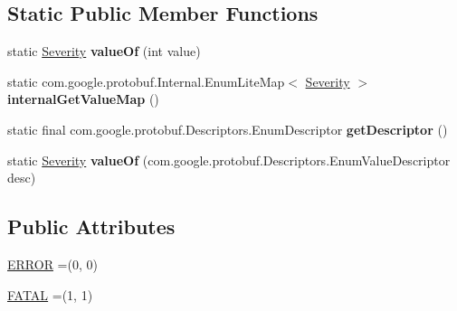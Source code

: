 \subsection*{Static Public Member Functions}
\begin{DoxyCompactItemize}
\item 
\mbox{\label{enumcom_1_1mysql_1_1cj_1_1x_1_1protobuf_1_1_mysqlx_1_1_error_1_1_severity_a1daeaa1ff1049d808780fcfdfad53342}} 
static \mbox{\hyperlink{enumcom_1_1mysql_1_1cj_1_1x_1_1protobuf_1_1_mysqlx_1_1_error_1_1_severity}{Severity}} {\bfseries value\+Of} (int value)
\item 
\mbox{\label{enumcom_1_1mysql_1_1cj_1_1x_1_1protobuf_1_1_mysqlx_1_1_error_1_1_severity_ac0fee37ff34068f9f9136e35feaab632}} 
static com.\+google.\+protobuf.\+Internal.\+Enum\+Lite\+Map$<$ \mbox{\hyperlink{enumcom_1_1mysql_1_1cj_1_1x_1_1protobuf_1_1_mysqlx_1_1_error_1_1_severity}{Severity}} $>$ {\bfseries internal\+Get\+Value\+Map} ()
\item 
\mbox{\label{enumcom_1_1mysql_1_1cj_1_1x_1_1protobuf_1_1_mysqlx_1_1_error_1_1_severity_adbaebbd562c962c4799803037fbb488b}} 
static final com.\+google.\+protobuf.\+Descriptors.\+Enum\+Descriptor {\bfseries get\+Descriptor} ()
\item 
\mbox{\label{enumcom_1_1mysql_1_1cj_1_1x_1_1protobuf_1_1_mysqlx_1_1_error_1_1_severity_a5c28b19e307791bd1abeaf7b2b4f506d}} 
static \mbox{\hyperlink{enumcom_1_1mysql_1_1cj_1_1x_1_1protobuf_1_1_mysqlx_1_1_error_1_1_severity}{Severity}} {\bfseries value\+Of} (com.\+google.\+protobuf.\+Descriptors.\+Enum\+Value\+Descriptor desc)
\end{DoxyCompactItemize}
\subsection*{Public Attributes}
\begin{DoxyCompactItemize}
\item 
\mbox{\hyperlink{enumcom_1_1mysql_1_1cj_1_1x_1_1protobuf_1_1_mysqlx_1_1_error_1_1_severity_a59b233ff90db9a379625c410973029dc}{E\+R\+R\+OR}} =(0, 0)
\item 
\mbox{\hyperlink{enumcom_1_1mysql_1_1cj_1_1x_1_1protobuf_1_1_mysqlx_1_1_error_1_1_severity_a3a5b48cfa733ad7766226ee47d1f7223}{F\+A\+T\+AL}} =(1, 1)
\end{DoxyCompactItemize}
